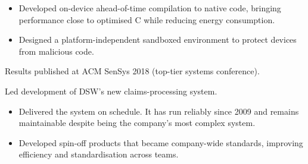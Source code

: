 \documentclass[10pt,a4paper]{../altacv}
\begin{document}
	\begin{itemize}
		\item Developed on-device ahead-of-time compilation to native code, bringing performance close to optimised C while reducing energy consumption.
		\item Designed a platform-independent sandboxed environment to protect devices from malicious code.
	\end{itemize}
	
	Results published at ACM SenSys 2018 (top-tier systems conference).
	
	\medskip
	
	\bigskip
	
	
	Led development of DSW's new claims-processing system.
	
	\begin{itemize}
		\item Delivered the system on schedule. It has run reliably since 2009 and remains maintainable despite being the company's most complex system.
		\item Developed spin-off products that became company-wide standards, improving efficiency and standardisation across teams.
	\end{itemize}
	
\end{document}
